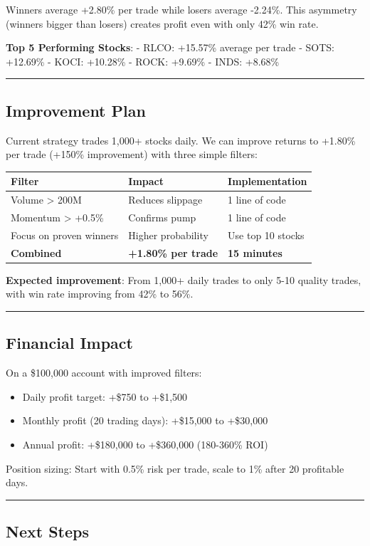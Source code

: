 \documentclass[
  11pt,
  letterpaper,
]{article}
\providecommand{\tightlist}{%
  \setlength{\itemsep}{0pt}\setlength{\parskip}{0pt}}\usepackage{longtable,booktabs,array}
\begin{document}
Winners average +2.80\% per trade while losers average -2.24\%. This
asymmetry (winners bigger than losers) creates profit even with only
42\% win rate.

\textbf{Top 5 Performing Stocks}: - RLCO: +15.57\% average per trade -
SOTS: +12.69\% - KOCI: +10.28\% - ROCK: +9.69\% - INDS: +8.68\%

\begin{center}\rule{0.5\linewidth}{0.5pt}\end{center}

\subsection{Improvement Plan}\label{improvement-plan}

Current strategy trades 1,000+ stocks daily. We can improve returns to
+1.80\% per trade (+150\% improvement) with three simple filters:

\begin{longtable}[]{@{}lll@{}}
\toprule\noalign{}
Filter & Impact & Implementation \\
\midrule\noalign{}
\endhead
\bottomrule\noalign{}
\endlastfoot
Volume \textgreater{} 200M & Reduces slippage & 1 line of code \\
Momentum \textgreater{} +0.5\% & Confirms pump & 1 line of code \\
Focus on proven winners & Higher probability & Use top 10 stocks \\
\textbf{Combined} & \textbf{+1.80\% per trade} & \textbf{15 minutes} \\
\end{longtable}

\textbf{Expected improvement}: From 1,000+ daily trades to only 5-10
quality trades, with win rate improving from 42\% to 56\%.

\begin{center}\rule{0.5\linewidth}{0.5pt}\end{center}

\subsection{Financial Impact}\label{financial-impact}

On a \$100,000 account with improved filters:

\begin{itemize}
\tightlist
\item
  Daily profit target: +\$750 to +\$1,500
\item
  Monthly profit (20 trading days): +\$15,000 to +\$30,000
\item
  Annual profit: +\$180,000 to +\$360,000 (180-360\% ROI)
\end{itemize}

Position sizing: Start with 0.5\% risk per trade, scale to 1\% after 20
profitable days.

\begin{center}\rule{0.5\linewidth}{0.5pt}\end{center}

\subsection{Next Steps}\label{next-steps}
\end{document}
